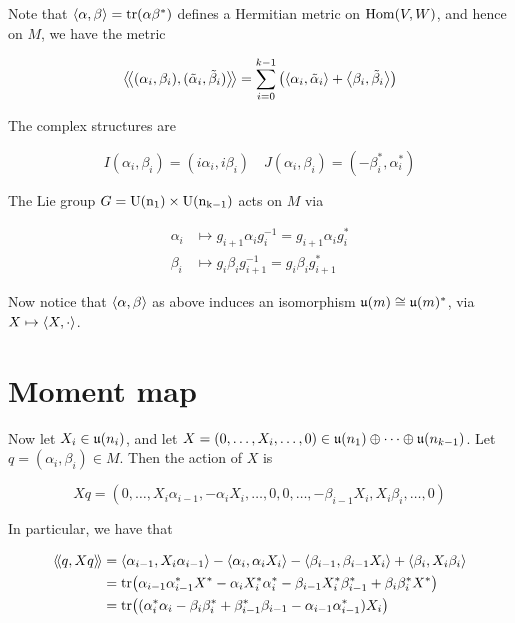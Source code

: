 \documentclass{article}
\newcommand{\iinner}[1]{\left\langle\!\left\langle #1 \right\rangle\!\right\rangle}
\begin{document}
Note that \(\left\langle \alpha, \beta \right\rangle = \tr(\alpha\beta^*)\) defines a Hermitian metric on \(\operatorname{Hom}(V, W)\), and hence on \(M\), we have the metric

\[\iinner{(\alpha_i, \beta_i), (\tilde\alpha_i, \tilde\beta_i)} = \sum_{i=0}^{k-1}\left(\inner{\alpha_i, \tilde\alpha_i} + \inner{\beta_i, \tilde\beta_i}\right)\]

The complex structures are

\[I(\alpha_i, \beta_i) = (i\alpha_i, i\beta_i) \quad J(\alpha_i, \beta_i) = (-\beta_i^*, \alpha_i^*)\]

The Lie group \(G = \rm U(n_1) \times \rm U(n_{k-1})\) acts on \(M\) via

\begin{equation*}
    \begin{split}
        \alpha_i &\mapsto g_{i+1}\alpha_i g_i^{-1} = g_{i+1}\alpha_i g_i^* \\
        \beta_i &\mapsto g_i\beta_i g_{i+1}^{-1} = g_i\beta_i g_{i+1}^*
    \end{split}
\end{equation*}

Now notice that \(\left\langle \alpha, \beta \right\rangle\) as above induces an isomorphism \(\mathfrak{u}(m) \cong \mathfrak{u}(m)^*\), via \(X \mapsto \left\langle X, \cdot \right\rangle\).

\section{Moment map}

Now let \(X_i \in \mathfrak{u}(n_i)\), and let \(X = (0, \dots, X_i, \dots, 0) \in \mathfrak{u}(n_1) \oplus \cdots \oplus \mathfrak{u}(n_{k-1})\). Let \(q = (\alpha_i, \beta_i) \in M\). Then the action of \(X\) is

\[Xq = (0, \dots, X_i \alpha_{i-1}, -\alpha_iX_i, \dots, 0, 0, \dots, -\beta_{i-1}X_i, X_i\beta_i, \dots, 0)\]

In particular, we have that

\begin{align*}
    \iinner{q, Xq} &= \inner{\alpha_{i-1}, X_i\alpha_{i-1}} - \inner{\alpha_i, \alpha_iX_i} - \inner{\beta_{i-1}, \beta_{i-1}X_i} + \inner{\beta_i, X_i\beta_i} \\
    &= \tr(\alpha_{i-1}\alpha_{i-1}^*X^* - \alpha_iX_i^*\alpha_i^* - \beta_{i-1}X_i^*\beta_{i-1}^* + \beta_i\beta_i^*X^*) \\
    &= \tr((\alpha_i^*\alpha_i - \beta_i\beta_i^* + \beta_{i-1}^*\beta_{i-1} - \alpha_{i-1}\alpha_{i-1}^*)X_i) \\
\end{align*}
\end{document}
